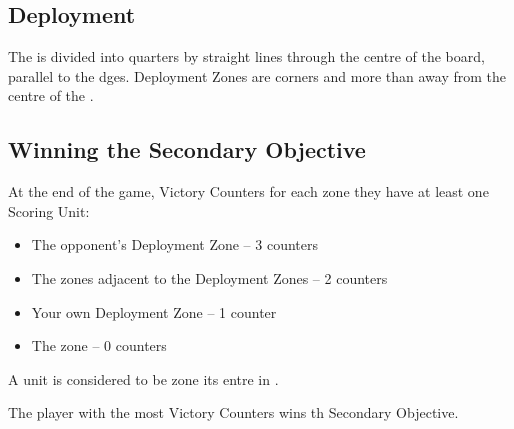 
\label{DominatingTheField}


\subsection*{Deployment}

The  is divided into quarters by  straight lines through the centre of the board, parallel to the  dges. Deployment Zones are  corners\rewordedrule{,} and more than  away from the centre of the .


\subsection*{Winning the Secondary Objective}

At the end of the game,  Victory Counters for each zone  they have at least one Scoring Unit:

\begin{itemize}
\item The opponent's Deployment Zone -- 3 counters
\item The zones adjacent to the Deployment Zones -- 2 counters 
\item Your own Deployment Zone -- 1 counter
\item The  zone -- 0 counters
\end{itemize}

A unit is considered to be  zone  its entre  in .

The player with the most Victory Counters wins th Secondary Objective.
